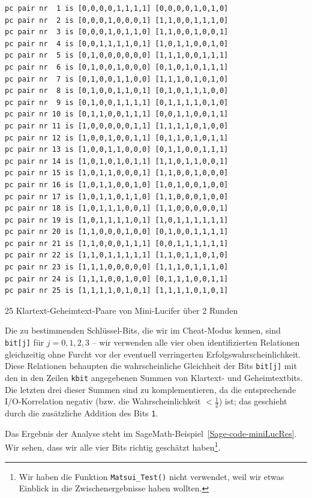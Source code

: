 \begin{refsegment}
\begin{sagecode}
\begin{verbatim}
pc pair nr  1 is [0,0,0,0,1,1,1,1] [0,0,0,0,1,0,1,0]
pc pair nr  2 is [0,0,0,1,0,0,0,1] [1,1,0,0,1,1,1,0]
pc pair nr  3 is [0,0,0,1,0,1,1,0] [1,1,0,0,1,0,0,1]
pc pair nr  4 is [0,0,1,1,1,1,0,1] [1,0,1,1,0,0,1,0]
pc pair nr  5 is [0,1,0,0,0,0,0,0] [1,1,1,0,0,1,1,1]
pc pair nr  6 is [0,1,0,0,1,0,0,0] [0,1,0,1,0,1,1,1]
pc pair nr  7 is [0,1,0,0,1,1,0,0] [1,1,1,0,1,0,1,0]
pc pair nr  8 is [0,1,0,0,1,1,0,1] [0,1,0,1,1,1,0,0]
pc pair nr  9 is [0,1,0,0,1,1,1,1] [0,1,1,1,1,0,1,0]
pc pair nr 10 is [0,1,1,0,0,1,1,1] [0,0,1,1,0,0,1,1]
pc pair nr 11 is [1,0,0,0,0,0,1,1] [1,1,1,1,0,1,0,0]
pc pair nr 12 is [1,0,0,1,0,0,1,1] [0,1,1,0,1,0,1,1]
pc pair nr 13 is [1,0,0,1,1,0,0,0] [0,1,1,0,0,1,1,1]
pc pair nr 14 is [1,0,1,0,1,0,1,1] [1,1,0,1,1,0,0,1]
pc pair nr 15 is [1,0,1,1,0,0,0,1] [1,1,0,0,1,0,0,0]
pc pair nr 16 is [1,0,1,1,0,0,1,0] [1,0,1,0,0,1,0,0]
pc pair nr 17 is [1,0,1,1,0,1,1,0] [1,1,0,0,0,1,0,0]
pc pair nr 18 is [1,0,1,1,1,0,0,1] [1,1,0,0,0,0,0,1]
pc pair nr 19 is [1,0,1,1,1,1,0,1] [1,0,1,1,1,1,1,1]
pc pair nr 20 is [1,1,0,0,0,1,0,0] [0,1,0,0,1,1,1,1]
pc pair nr 21 is [1,1,0,0,0,1,1,1] [0,0,1,1,1,1,1,1]
pc pair nr 22 is [1,1,0,1,1,1,1,1] [1,1,0,1,1,0,1,0]
pc pair nr 23 is [1,1,1,0,0,0,0,0] [1,1,1,0,1,1,1,0]
pc pair nr 24 is [1,1,1,0,0,1,0,0] [0,1,1,1,0,0,1,1]
pc pair nr 25 is [1,1,1,1,0,1,0,1] [1,1,1,1,0,1,0,1]
\end{verbatim}
\caption{25 Klartext-Geheimtext-Paare von Mini-Lucifer über 2 Runden}\label{Sage-code-miniLucKP}
\end{sagecode}

Die zu bestimmenden Schlüssel-Bits, die wir im Cheat-Modus kennen, sind
\verb:bit[j]: für $j = 0, 1, 2, 3$ -- wir verwenden alle vier oben
identifizierten Relationen gleichzeitig ohne Furcht vor der eventuell
verringerten Erfolgswahrscheinlichkeit. Diese Relationen behaupten die
wahrscheinliche Gleichheit der Bits \verb:bit[j]: mit den in den
Zeilen \verb:kbit: angegebenen Summen von Klartext- und Geheimtextbits.
Die letzten drei dieser Summen sind zu komplementieren, da die entsprechende
I/O-Korrelation negativ (bzw. die Wahrscheinlichkeit $< \frac{1}{2}$)
ist; das geschieht durch die zusätzliche Addition des Bits \verb:1:.

Das Ergebnis der Analyse steht im SageMath-Beispiel~\ref{Sage-code-miniLucRes}.
Wir sehen, dass wir alle vier Bits richtig geschätzt haben\footnote{%
   Wir haben die Funktion {\tt Matsui\_Test()} nicht verwendet, weil wir
   etwas Einblick in die Zwischenergebnisse haben wollten.
}.


\end{refsegment}
